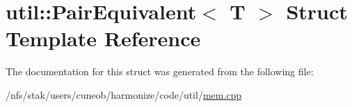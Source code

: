 \hypertarget{structutil_1_1PairEquivalent}{\section{util\-:\-:Pair\-Equivalent$<$ T $>$ Struct Template Reference}
\label{structutil_1_1PairEquivalent}
}


The documentation for this struct was generated from the following file\-:\begin{DoxyCompactItemize}
\item 
/nfs/stak/users/cuneob/harmonize/code/util/\hyperlink{mem_8cpp}{mem.\-cpp}\end{DoxyCompactItemize}
